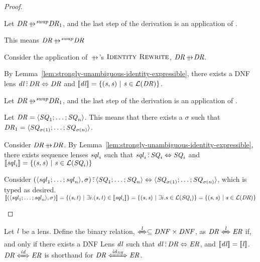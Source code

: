 \documentclass[numbers,10pt,preprint\ifanon ,nocopyrightspace\fi]{sigplanconf}
\begin{document}
\begin{proof}
  \begin{case}[\IdentityRewriteRule{}]
    Let $\DNFRegex \ParallelRewriteSwap \DNFRegex_1$, and the last step of the
    derivation is an application of \IdentityRewriteRule{}.

    This means $\DNFRegex \ParallelRewriteSwap \DNFRegex$

    Consider the application of $\ParallelRewrite{}$'s $\textsc{Identity Rewrite}$,
    $\DNFRegex \ParallelRewrite \DNFRegex$.

    By Lemma~\ref{lem:strongly-unambiguous-identity-expressible}, there exists
    a DNF lens
    $\mathit{dl} \,\tilde{:}\, \mathit{DR} \Leftrightarrow \mathit{DR}$ and
    $[ \! [\mathit{dl}] \! ] = \{(\mathit{s},\mathit{s}) ~|~ \mathit{s} \in
      \mathcal{L}(\mathit{DR})\}$.
  \end{case}

  \begin{case}[\DNFReorderRule{}]
    Let $\DNFRegex \ParallelRewriteSwap \DNFRegex_1$, and the last step of the
    derivation is an application of \DNFReorderRule{}.

    Let $\mathit{DR} = \langle\mathit{SQ}_1;\ldots;\mathit{SQ}_n\rangle$.
    This means that there exists a $\sigma$ such that
    $\mathit{DR}_1 = \langle\mathit{SQ}_{\sigma(1)};\ldots;\mathit{SQ}_{\sigma(n)}\rangle$.

    Consider $\DNFRegex \ParallelRewrite \DNFRegex$.
    By Lemma~\ref{lem:strongly-unambiguous-identity-expressible}, there exists
    sequence lenses $\mathit{sql}_i$ such that $\mathit{sql}_i
    \,\tilde{:}\, \mathit{SQ}_i \Leftrightarrow \mathit{SQ}_i$ and
    $[ \! [\mathit{sql}_i] \! ] = \{(\mathit{s},\mathit{s}) ~|~ \mathit{s}
      \in \mathcal{L}(\mathit{SQ}_i)\}$

    Consider $(\langle\mathit{sql}_1;\ldots;\mathit{sql}_n\rangle,\sigma)
    \,\tilde{:}\, \langle\mathit{SQ}_1;\ldots;\mathit{SQ}_n\rangle
    \Leftrightarrow \langle\mathit{SQ}_{\sigma(1)};\ldots;\mathit{SQ}_{\sigma(n)}\rangle$,
    which is typed as desired.
    $[ \! [(\langle\mathit{sql}_1;\ldots;\mathit{sql}_n\rangle,\sigma)] \! ] =
    \{(\mathit{s},\mathit{t}) ~|~ \exists i. (\mathit{s},\mathit{t}) \in
      [ \! [\mathit{sql}_i] \! ]\} =
    \{(\mathit{s},\mathit{s}) ~|~ \exists i. \mathit{s} \in
      \mathcal{L}(\mathit{SQ}_i)\} =
    \{(\mathit{s},\mathit{s}) ~|~ \mathit{s} \in \mathcal{L}(\mathit{DR})\}$
  \end{case}
\end{proof}

\begin{definition}
  Let $\mathit{l}$ be a lens.
  Define the binary relation, $\DNFLensHasSemanticsOf{\Lens}\subseteq \DNFRegexType
  \Cross\DNFRegexType$, as
  $\SatisfiesDNFLensHasSemanticsOf{\Lens}{\DNFRegex}{\DNFRegexAlt}$ if, and
  only if there exists a DNF Lens $\mathit{dl}$ such that $\mathit{dl}
  \,\tilde{:}\, \mathit{DR} \Leftrightarrow \mathit{ER}$, and
  $[ \! [\mathit{dl}] \! ]=[ \! [\mathit{l}] \! ]$.
  $\SatisfiesIdentitySemantics{\DNFRegex}{\DNFRegexAlt}$ is
  shorthand for
  $\SatisfiesDNFLensHasSemanticsOf{\IdentityLensOf{\DNFRegex}}{\DNFRegex}{\DNFRegexAlt}$.
\end{definition}
\end{document}
